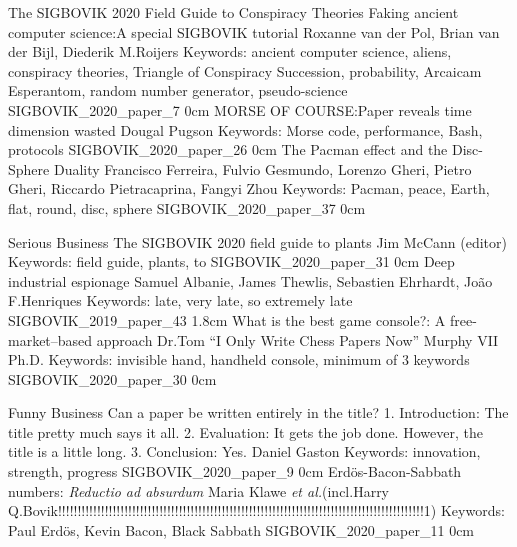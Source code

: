 \addtrack
	{}{\LARGE The SIGBOVIK 2020 Field Guide to Conspiracy Theories}
\addpaper
	{Faking ancient computer science:\@ A special SIGBOVIK tutorial}
	{Roxanne van der Pol, Brian van der Bijl, Diederik M.\@ Roijers}
	{Keywords: ancient computer science, aliens, conspiracy theories, Triangle of Conspiracy Succession, probability, Arcaicam Esperantom, random number generator, pseudo-science}
	{SIGBOVIK_2020_paper_7}
	{0cm}
	{}
\addpaper
	{MORSE OF COURSE:\@ Paper reveals time dimension wasted}
	{Dougal Pugson}
	{Keywords: Morse code, performance, Bash, protocols}
	{SIGBOVIK_2020_paper_26}
	{0cm}
	{}
\addpaper
	{The Pacman effect and the Disc-Sphere Duality}
	{Francisco Ferreira, Fulvio Gesmundo, Lorenzo Gheri, Pietro Gheri, Riccardo Pietracaprina, Fangyi Zhou}
	{Keywords: Pacman, peace, Earth, flat, round, disc, sphere}
	{SIGBOVIK_2020_paper_37}
	{0cm}
	{}

\addtrack
	{}{Serious Business}
\addpaper
	{The SIGBOVIK 2020 field guide to plants}
	{Jim McCann (editor)}
	{Keywords: field guide, plants, to}
	{SIGBOVIK_2020_paper_31}
	{0cm}
	{}
\addpaper
	{Deep industrial espionage}
	{Samuel Albanie, James Thewlis, Sebastien Ehrhardt, Jo\~ao F.\@ Henriques}
	{Keywords: late, very late, so extremely late}
	{SIGBOVIK_2019_paper_43}
	{1.8cm}
	{}
\addpaper
	{What is the best game console?: A free-market--based approach}
	{Dr.\@ Tom ``I Only Write Chess Papers Now'' Murphy VII Ph.D.}
	{Keywords: invisible hand, handheld console, minimum of 3 keywords}
	{SIGBOVIK_2020_paper_30}
	{0cm}
	{}

\addtrack
	{}{Funny Business}
\addpaper
	{Can a paper be written entirely in the title? 1. Introduction: The title pretty much says it all. 2. Evaluation: It gets the job done. However, the title is a little long. 3. Conclusion: Yes.}
	{Daniel Gaston}
	{Keywords: innovation, strength, progress}
	{SIGBOVIK_2020_paper_9}
	{0cm}
	{}
\addpaper
	{Erd\"os-Bacon-Sabbath numbers: \textit{Reductio ad absurdum}}
	{Maria Klawe \textit{et al.}\@ (incl.\@ Harry Q.\@ Bovik!!!!!!!!!!!!!!!!!!!!!!!!!!!!!!!!!!!!!!!!!!!!!!!!!!!!!!!!!!!!!!!!!!!!!!!!!!!!!!!!!!!!!!!!!!!!!!1)}
	{Keywords: Paul Erd\"os, Kevin Bacon, Black Sabbath}
	{SIGBOVIK_2020_paper_11}
	{0cm}
	{}
